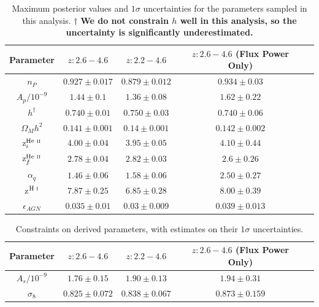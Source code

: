 \documentclass[a4paper,11pt]{article}
\begin{document}
\begin{table}[tbp]
	\centering
     \def\arraystretch{1.2}
     \begin{tabular}{|c|c|c|c|c|}
		\hline
		Parameter & $z: 2.6-4.6$ & $z: 2.2-4.6$ & $z: 2.6-4.6$ (Flux Power Only)\\
		\hline \hline
        $n_P$ & $0.927\pm0.017$ & $0.879\pm0.012$ & $0.934\pm0.03$\\
    	  $A_p/10^{-9}$ & $1.44\pm0.1$ & $1.36\pm0.08$ & $1.62\pm0.22$\\
        $h^{\dagger}$ & $0.740\pm0.01$ & $0.750\pm0.03$ & $0.740\pm0.06$\\
        $\Omega_M h^2$ & $0.141\pm0.001$ & $0.14\pm0.001$ & $0.142\pm0.002$\\
        z$^{\text{He~{\sc ii}}}_i$ & $4.00\pm0.04$ & $3.95\pm0.05$ & $4.10\pm0.44$\\
        z$^{\text{He~{\sc ii}}}_f$ & $2.78\pm0.04$ & $2.82\pm0.03$ & $2.6\pm0.26$\\
        $\alpha_q$ & $1.46\pm0.06$ & $1.58\pm0.06$ & $2.50\pm0.27$\\
		z$^{\text{H~{\sc i}}}$ & $7.87\pm0.25$ & $6.85\pm0.28$ & $8.00\pm0.39$\\
        $\epsilon_{AGN}$ & $0.035\pm0.01$ & $0.03\pm 0.009$ & $0.039\pm0.013$\\
		\hline
	\end{tabular}
    \caption{\label{table:parameters}
    Maximum posterior values and $1\sigma$ uncertainties for the parameters sampled in this analysis.
    $\dagger$ \textbf{We do not constrain $h$ well in this analysis, so the uncertainty is significantly underestimated.}
    }
\end{table}

\begin{table}[tbp]
	\centering
     \def\arraystretch{1.2}
     \begin{tabular}{|c|c|c|c|c|}
		\hline
		Parameter & $z: 2.6-4.6$ & $z: 2.2-4.6$ & $z: 2.6-4.6$ (Flux Power Only)\\
		\hline \hline
        $A_s/10^{-9}$ & $1.76\pm0.15$ & $1.90\pm0.13$ & $1.94\pm0.31$\\
        $\sigma_8$ & $0.825\pm0.072$ & $0.838\pm0.067$ & $0.873\pm0.159$\\
        \hline
	\end{tabular}
    \caption{\label{table:derived_par}
    Constraints on derived parameters, with estimates on their $1\sigma$ uncertainties.
    }
\end{table}
\end{document}
